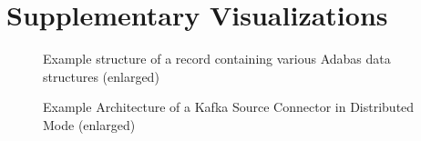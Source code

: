 \chapter{Supplementary Visualizations}

\begin{figure}[htbp]
    \centering
    \caption{Example structure of a record containing various Adabas data structures (enlarged)}
    \label{fig:appendix02:results:artavgmessage}
\end{figure}

\begin{figure}[htbp]
 \centering
 \caption{Example Architecture of a Kafka Source Connector in Distributed Mode (enlarged)}
 \label{fig:appendix02:kafkaconnectarchitecture}
\end{figure}

